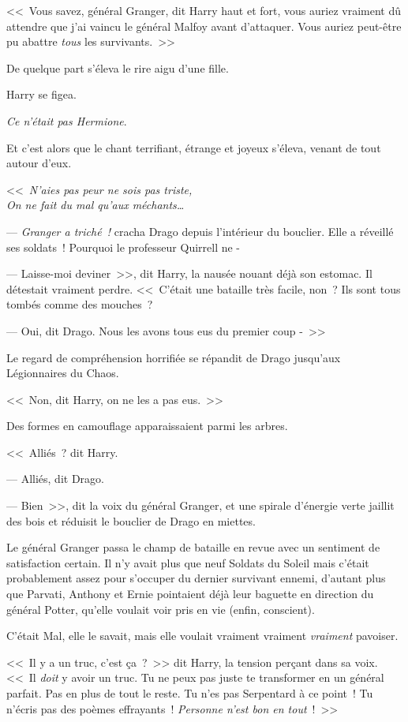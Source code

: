 <<~Vous savez, général Granger, dit Harry haut et fort, vous auriez vraiment dû attendre que j'ai vaincu le général Malfoy avant d'attaquer. Vous auriez peut-être pu abattre \emph{tous} les survivants.~>>

De quelque part s'éleva le rire aigu d'une fille.

Harry se figea.

\emph{Ce n'était pas Hermione}.

Et c'est alors que le chant terrifiant, étrange et joyeux s'éleva, venant de tout autour d'eux.

<<~\emph{N'aies pas peur ne sois pas triste,\\ On ne fait du mal qu'aux méchants…}

--- \emph{Granger a triché~!} cracha Drago depuis l'intérieur du bouclier. Elle a réveillé ses soldats~! Pourquoi le professeur Quirrell ne -

--- Laisse-moi deviner~>>, dit Harry, la nausée nouant déjà son estomac. Il détestait vraiment perdre. <<~C'était une bataille très facile, non~? Ils sont tous tombés comme des mouches~?

--- Oui, dit Drago. Nous les avons tous eus du premier coup -~>>

Le regard de compréhension horrifiée se répandit de Drago jusqu'aux Légionnaires du Chaos.

<<~Non, dit Harry, on ne les a pas eus.~>>

Des formes en camouflage apparaissaient parmi les arbres.

<<~Alliés~? dit Harry.

--- Alliés, dit Drago.

--- Bien~>>, dit la voix du général Granger, et une spirale d'énergie verte jaillit des bois et réduisit le bouclier de Drago en miettes.

\later

Le général Granger passa le champ de bataille en revue avec un sentiment de satisfaction certain. Il n'y avait plus que neuf Soldats du Soleil mais c'était probablement assez pour s'occuper du dernier survivant ennemi, d'autant plus que Parvati, Anthony et Ernie pointaient déjà leur baguette en direction du général Potter, qu'elle voulait voir pris en vie (enfin, conscient).

C'était Mal, elle le savait, mais elle voulait vraiment vraiment \emph{vraiment} pavoiser.

<<~Il y a un truc, c'est ça~?~>> dit Harry, la tension perçant dans sa voix. <<~Il \emph{doit} y avoir un truc. Tu ne peux pas juste te transformer en un général parfait. Pas en plus de tout le reste. Tu n'es pas Serpentard à ce point~! Tu n'écris pas des poèmes effrayants~! \emph{Personne n'est bon en tout}~!~>>

